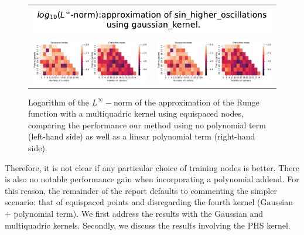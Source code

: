 \documentclass[12pt]{report} %
\begin{document}
\begin{figure}[H]
  \begin{tabular}{cc}
    \multicolumn{2}{c}{{\includegraphics[width=.5\textwidth]
    {imagenes/experiments/1d/variational/linf_sin_higher_oscillations_gaussian_kernel_Points_Title.pdf}}}                                                                                       \\
    {\includegraphics[height=.4\textwidth, trim={0 0 11.5cm 0},clip=true]
    {imagenes/experiments/1d/variational/linf_sin_higher_oscillations_gaussian_kernel_Points_Comparison.pdf}}  &
     {\includegraphics[height=.4\textwidth, trim={9.5cm 0 0 0},clip=true]{imagenes/experiments/1d/variational/linf_sin_higher_oscillations_gaussian_kernel_Points_Comparison.pdf}} \\
  \end{tabular}
  \caption{Logarithm of the $L^\infty-$norm of the approximation of the Runge function with a multiquadric kernel using equispaced nodes, comparing the performance our method using no polynomial term (left-hand side) as well as a linear polynomial term (right-hand side).}
  \label{fig:sin-higher-oscillations-gaussian-kernel-comparison}
\end{figure}

Therefore, it is not clear if any particular choice of training nodes is better. There is also no notable performance gain when incorporating a polynomial addend. For this reason, the remainder of the report defaults to commenting the simpler
scenario: that of equispaced points and disregarding the fourth kernel (Gaussian + polynomial term). We first address the results with the Gaussian and multiquadric kernels. Secondly, we discuss the results involving the PHS kernel.
\end{document}
